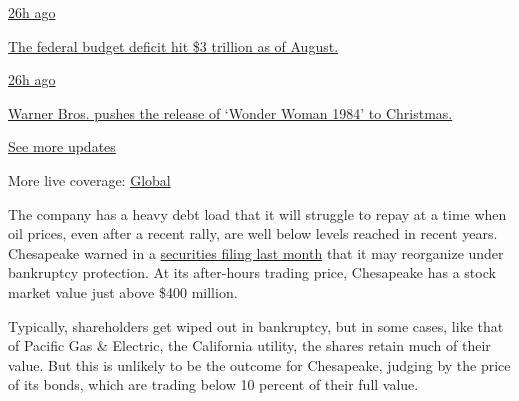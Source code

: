 \href{https://www.nytimes3xbfgragh.onion/live/2020/09/11/business/stock-market-today-coronavirus?action=click\&pgtype=Article\&state=default\&region=MAIN_CONTENT_1\&context=storylines_live_updates\#the-federal-budget-deficit-hit-3-trillion-as-of-august}{26h
ago}

\href{https://www.nytimes3xbfgragh.onion/live/2020/09/11/business/stock-market-today-coronavirus?action=click\&pgtype=Article\&state=default\&region=MAIN_CONTENT_1\&context=storylines_live_updates\#the-federal-budget-deficit-hit-3-trillion-as-of-august}{The
federal budget deficit hit \$3 trillion as of August.}

\href{https://www.nytimes3xbfgragh.onion/live/2020/09/11/business/stock-market-today-coronavirus?action=click\&pgtype=Article\&state=default\&region=MAIN_CONTENT_1\&context=storylines_live_updates\#warner-bros-pushes-the-release-of-wonder-woman-1984-to-christmas}{26h
ago}

\href{https://www.nytimes3xbfgragh.onion/live/2020/09/11/business/stock-market-today-coronavirus?action=click\&pgtype=Article\&state=default\&region=MAIN_CONTENT_1\&context=storylines_live_updates\#warner-bros-pushes-the-release-of-wonder-woman-1984-to-christmas}{Warner
Bros. pushes the release of `Wonder Woman 1984' to Christmas.}

\href{https://www.nytimes3xbfgragh.onion/live/2020/09/11/business/stock-market-today-coronavirus?action=click\&pgtype=Article\&state=default\&region=MAIN_CONTENT_1\&context=storylines_live_updates}{See
more updates}

More live coverage:
\href{https://www.nytimes3xbfgragh.onion/2020/09/11/world/covid-19-coronavirus.html?action=click\&pgtype=Article\&state=default\&region=MAIN_CONTENT_1\&context=storylines_live_updates}{Global}

The company has a heavy debt load that it will struggle to repay at a
time when oil prices, even after a recent rally, are well below levels
reached in recent years. Chesapeake warned in a
\href{https://www.sec.gov/Archives/edgar/data/895126/000089512620000115/chk-2020033110q.htm\#s8319C3A53B5D5EA88220B634C1A28003}{securities
filing last month} that it may reorganize under bankruptcy protection.
At its after-hours trading price, Chesapeake has a stock market value
just above \$400 million.

Typically, shareholders get wiped out in bankruptcy, but in some cases,
like that of Pacific Gas \& Electric, the California utility, the shares
retain much of their value. But this is unlikely to be the outcome for
Chesapeake, judging by the price of its bonds, which are trading below
10 percent of their full value.

